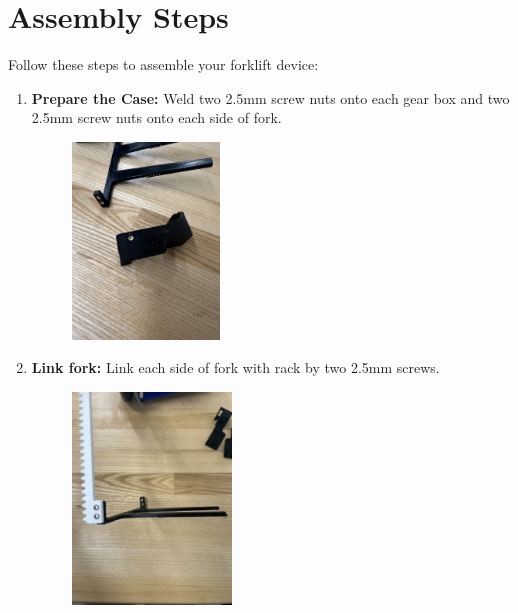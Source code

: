 \documentclass{article}
\begin{document}
\section{Assembly Steps}
Follow these steps to assemble your forklift device:\\


\begin{enumerate}[label=Step \arabic*:,leftmargin=*,align=left]
    \item \textbf{Prepare the Case:}
    Weld two 2.5mm screw nuts onto each gear box and two 2.5mm screw nuts onto each side of fork.
    \begin{figure}[H]
        \centering
        \includegraphics[width=0.37\textwidth]{1.jpg}
        \captionsetup{justification=centering}
        \caption{}
    \end{figure}  

    \item \textbf{Link fork:}
    Link each side of fork with rack by two 2.5mm screws.

    \begin{figure}[H]
        \centering
        \includegraphics[width=0.40\textwidth]{3.jpg}
        \captionsetup{justification=centering}
        \caption{}
    \end{figure}  


\end{enumerate}
\end{document}
